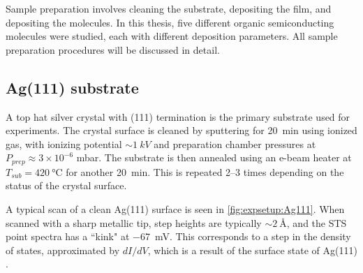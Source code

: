 Sample preparation involves cleaning the substrate, depositing the  film, and depositing the molecules. In this thesis, five different organic semiconducting molecules were studied, each with different deposition parameters. All sample preparation procedures will be discussed in detail.

\subsection*{Ag(111) substrate}

A top hat silver crystal with (111) termination is the primary substrate used for experiments. The crystal surface is cleaned by sputtering for \SI{20}{\minute} using ionized  gas, with ionizing potential $\sim \SI{1}{kV}$ and preparation chamber pressures at $P_{prep} \approx 3 \times 10^{-6}$ mbar. The substrate is then annealed using an e-beam heater at $T_{sub} = \SI{420}{\celsius}$ for another \SI{20}{\minute}. This is repeated 2--3 times depending on the status of the crystal surface.

A typical scan of a clean Ag(111) surface is seen in \autoref{fig:expsetup:Ag111}. When scanned with a sharp metallic tip, step heights are typically $\sim\SI{2}{\angstrom}$, and the \ac{STS} point spectra has a ``kink" at \SI{-67}{mV}. This corresponds to a step in the density of states, approximated by $dI/dV$, which is a result of the surface state of Ag(111) \citep{hovel2001modification}.

